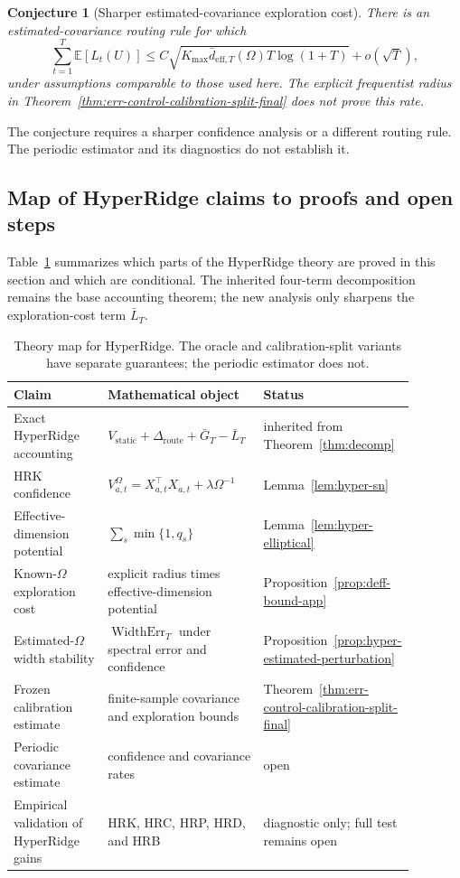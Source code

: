 \documentclass{article} %
\newtheorem{conjecture}{Conjecture}
\begin{document}
\begin{conjecture}[Sharper estimated-covariance exploration cost]
\label{conj:err-control}
There is an estimated-covariance routing rule for which
\begin{equation}
\label{eq:hyper-conj-err}
\sum_{t=1}^{T}\mathbb{E}[L_t(U)]
\le C\sqrt{
K_{\max}\bar d_{\mathrm{eff},T}(\Omega)T\log(1+T)}
+ o(\sqrt{T}),
\end{equation}
under assumptions comparable to those used here. The explicit frequentist
radius in Theorem~\ref{thm:err-control-calibration-split-final} does not prove
this rate.
\end{conjecture}

The conjecture requires a sharper confidence analysis or a different routing
rule. The periodic estimator and its diagnostics do not establish it.

\subsection{Map of HyperRidge claims to proofs and open steps}
\label{sec:theory-hyper-map}

Table~\ref{tab:hyper-theory-map} summarizes which parts of the HyperRidge theory are proved in this section and which are conditional.  The inherited four-term decomposition remains the base accounting theorem; the new analysis only sharpens the exploration-cost term \(\bar L_T\).

\begin{table}[h]
\centering
\small
\begin{tabular}{
p{0.24\linewidth}
p{0.39\linewidth}
p{0.25\linewidth}}
\toprule
Claim & Mathematical object & Status \\
\midrule
Exact HyperRidge accounting & \(V_{\mathrm{static}}+\Delta_{\mathrm{route}}+\bar G_T-\bar L_T\) & inherited from Theorem~\ref{thm:decomp} \\
HRK confidence & \(V_{a,t}^{\Omega}=X_{a,t}^{\top}X_{a,t}+\lambda\Omega^{-1}\) & Lemma~\ref{lem:hyper-sn} \\
Effective-dimension potential & \(\sum_s \min\{1,q_s\}\) & Lemma~\ref{lem:hyper-elliptical} \\
Known-\(\Omega\) exploration cost & explicit radius times effective-dimension potential & Proposition~\ref{prop:deff-bound-app} \\
Estimated-\(\Omega\) width stability & \(\operatorname{WidthErr}_T\) under spectral error and confidence & Proposition~\ref{prop:hyper-estimated-perturbation} \\
Frozen calibration estimate & finite-sample covariance and exploration bounds & Theorem~\ref{thm:err-control-calibration-split-final} \\
Periodic covariance estimate & confidence and covariance rates & open \\
Empirical validation of HyperRidge gains & HRK, HRC, HRP, HRD, and HRB & diagnostic only; full test remains open \\
\bottomrule
\end{tabular}
\caption{Theory map for HyperRidge. The oracle and
calibration-split variants have separate guarantees; the periodic estimator
does not.}
\label{tab:hyper-theory-map}
\end{table}
\end{document}
